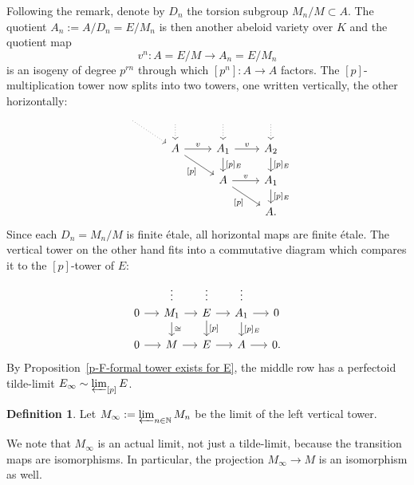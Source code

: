 \documentclass[10pt,oneside]{amsart}
\theoremstyle{definition}
\newtheorem{definition}[theorem]{Definition}
\newcommand{\N}{\mathbb{N}}
\begin{document}
	Following the remark, denote by $D_n$ the torsion subgroup $M_n/M\subset A$. The quotient $A_n:=A/D_n = E/M_n$ is then another abeloid variety over $K$ and the quotient map 
	\[v^n\colon A=E/M\rightarrow A_n=E/M_n\] is an isogeny of degree $p^{rn}$  through which  $[p^n]\colon A\rightarrow A$ factors. The $[p]$-multiplication tower now splits into two towers, one written vertically, the other horizontally:
		\begin{equation}\label{p-multiplication tower of E/M splits into vertical and horizontal tower}
		\begin{tikzcd}[row sep={1cm,between origins},column sep={1.5cm,between origins}]
		{} \arrow[rd, dotted] & {} \arrow[d, dotted]           & {} \arrow[d, dotted]           & {} \arrow[d, dotted]    \\
		& A \arrow[r,"v"] \arrow[rd,"{[p]}"'] & {A_1} \arrow[d,"{[p]_E}"] \arrow[r,"v"]  & {A_2} \arrow[d,"{[p]_E}"]     \\
		&                                & A\arrow[r,"v"] \arrow[rd,"{[p]}"'] & {A_1} \arrow[d, ,"{[p]_E}"] \\
		&                                &                                & {A.}              
		\end{tikzcd}
		\end{equation}
		Since each $D_n=M_n/M$ is finite \'etale, all horizontal maps are finite \'etale. The vertical tower on the other hand fits into a commutative diagram which compares it to the $[p]$-tower of $E$:
		\begin{equation}\label{F-tower for E/M}
		\begin{tikzcd}[column sep={1.1cm,between origins},row sep={0.5cm,between origins}]
			&\vdots&\vdots&\vdots&\\
			0 \arrow[r] & M_1 \arrow[dd, "\cong"] \arrow[r] & E \arrow[dd, "{[p]}"] \arrow[r] & A_1 \arrow[dd, "{[p]_E}"] \arrow[r] & 0 \\
			\\
			0 \arrow[r] & M \arrow[r] & E \arrow[r] & A \arrow[r] & 0.
		\end{tikzcd}
		\end{equation}
		By Proposition~\ref{p-F-formal tower exists for E}, the middle row has a perfectoid tilde-limit $E_\infty\sim \varprojlim_{[p]}E$.
		\begin{definition}
			Let $M_\infty:=\varprojlim_{n\in\N} M_n$ be the limit of the left vertical tower. 
		\end{definition}
		We note that $M_\infty$ is an actual limit, not just a tilde-limit, because the transition maps are isomorphisms. In particular, the projection $M_\infty\to M$ is an isomorphism as well. 
\end{document}
